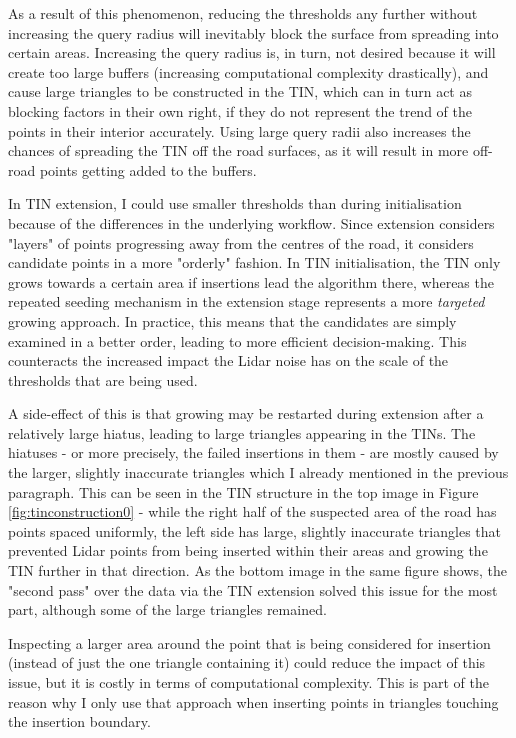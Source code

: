 As a result of this phenomenon, reducing the thresholds any further without increasing the query radius will inevitably block the surface from spreading into certain areas. Increasing the query radius is, in turn, not desired because it will create too large buffers (increasing computational complexity drastically), and cause large triangles to be constructed in the TIN, which can in turn act as blocking factors in their own right, if they do not represent the trend of the points in their interior accurately. Using large query radii also increases the chances of spreading the TIN off the road surfaces, as it will result in more off-road points getting added to the buffers.

In TIN extension, I could use smaller thresholds than during initialisation because of the differences in the underlying workflow. Since extension considers "layers" of points progressing away from the centres of the road, it considers candidate points in a more "orderly" fashion. In TIN initialisation, the TIN only grows towards a certain area if insertions lead the algorithm there, whereas the repeated seeding mechanism in the extension stage represents a more \textit{targeted} growing approach. In practice, this means that the candidates are simply examined in a better order, leading to more efficient decision-making. This counteracts the increased impact the Lidar noise has on the scale of the thresholds that are being used.

A side-effect of this is that growing may be restarted during extension after a relatively large hiatus, leading to large triangles appearing in the TINs. The hiatuses - or more precisely, the failed insertions in them - are mostly caused by the larger, slightly inaccurate triangles which I already mentioned in the previous paragraph. This can be seen in the TIN structure in the top image in Figure \ref{fig:tinconstruction0} - while the right half of the suspected area of the road has points spaced uniformly, the left side has large, slightly inaccurate triangles that prevented Lidar points from being inserted within their areas and growing the TIN further in that direction. As the bottom image in the same figure shows, the "second pass" over the data via the TIN extension solved this issue for the most part, although some of the large triangles remained.

Inspecting a larger area around the point that is being considered for insertion (instead of just the one triangle containing it) could reduce the impact of this issue, but it is costly in terms of computational complexity. This is part of the reason why I only use that approach when inserting points in triangles touching the insertion boundary.


